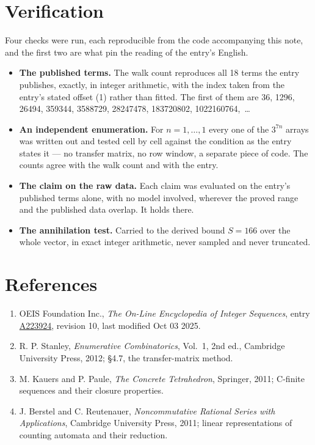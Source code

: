 \documentclass[11pt]{article}
\theoremstyle{definition}
\begin{document}
\section{Verification}

Four checks were run, each reproducible from the code accompanying this note, and the first two are what pin the reading of the entry's English.

\begin{itemize}

\item {\bfseries The published terms.} The walk count reproduces all 18 terms the entry publishes, exactly, in integer arithmetic, with the index taken from the entry's stated offset (1) rather than fitted. The first of them are 36, 1296, 26494, 359344, 3588729, 28247478, 183720802, 1022160764,~\dots

\item {\bfseries An independent enumeration.} For $n = 1,\dots,1$ every one of the $3^{7n}$ arrays was written out and tested cell by cell against the condition as the entry states it --- no transfer matrix, no row window, a separate piece of code. The counts agree with the walk count and with the entry.

\item {\bfseries The claim on the raw data.} Each claim was evaluated on the entry's published terms alone, with no model involved, wherever the proved range and the published data overlap. It holds there.

\item {\bfseries The annihilation test.} Carried to the derived bound $S = 166$ over the whole vector, in exact integer arithmetic, never sampled and never truncated.

\end{itemize}

\section{References}

\begin{enumerate}

\item OEIS Foundation Inc., \emph{The On-Line Encyclopedia of Integer Sequences}, entry \href{https://oeis.org/A223924}{A223924}, revision 10, last modified Oct 03 2025.

\item R. P. Stanley, \emph{Enumerative Combinatorics}, Vol.~1, 2nd ed., Cambridge University Press, 2012; \S4.7, the transfer-matrix method.

\item M. Kauers and P. Paule, \emph{The Concrete Tetrahedron}, Springer, 2011; C-finite sequences and their closure properties.

\item J. Berstel and C. Reutenauer, \emph{Noncommutative Rational Series with Applications}, Cambridge University Press, 2011; linear representations of counting automata and their reduction.

\end{enumerate}
\end{document}
